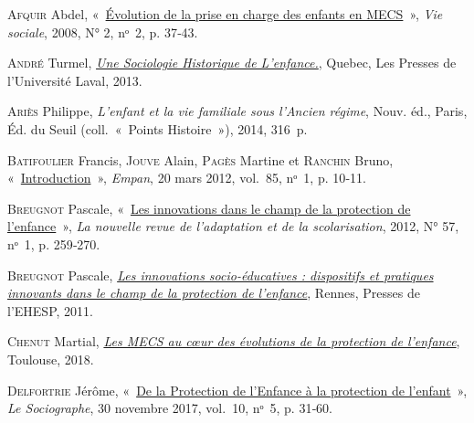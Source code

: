 \documentclass[
  12,
  a4paper,
]{report}
\newlength{\cslhangindent}
\newlength{\cslentryspacingunit} %
\newenvironment{CSLReferences}[2] %
 {%
  \setlength{\parindent}{0pt}
  \ifodd #1
  \let\oldpar\par
  \def\par{\hangindent=\cslhangindent\oldpar}
  \fi
  \setlength{\parskip}{#2\cslentryspacingunit}
 }%
 {}
\begin{document}
\hypertarget{refs}{}
\begin{CSLReferences}{0}{0}
\leavevmode{}%
\textsc{Afquir} Abdel,
{«~\href{https://www.cairn.info/revue-vie-sociale-2008-2-page-37.htm}{Évolution
de la prise en charge des enfants en MECS}~»}, \emph{Vie sociale}, 2008,
N° 2, nᵒ~2, p. 37‑43.

\leavevmode{}%
\textsc{André} Turmel,
\emph{\href{https://public.ebookcentral.proquest.com/choice/publicfullrecord.aspx?p=5514502}{Une
Sociologie Historique de L'enfance.}}, {Quebec}, {Les Presses de
l'Université Laval}, 2013.

\leavevmode{}%
\textsc{Ariès} Philippe, \emph{L'enfant et la vie familiale sous
l'Ancien régime}, Nouv. éd., {Paris}, {Éd. du Seuil} (coll.~{«~Points
Histoire~»}), 2014, 316~p.

\leavevmode{}%
\textsc{Batifoulier} Francis, \textsc{Jouve} Alain, \textsc{Pagès}
Martine et \textsc{Ranchin} Bruno,
{«~\href{http://www.cairn.info/revue-empan-2012-1-page-10.htm}{Introduction}~»},
\emph{Empan}, 20 mars 2012, vol.~85, nᵒ~1, p. 10‑11.

\leavevmode{}%
\textsc{Breugnot} Pascale,
{«~\href{https://www.cairn.info/revue-la-nouvelle-revue-de-l-adaptation-et-de-la-scolarisation-2012-1-page-259.htm}{Les
innovations dans le champ de la protection de l'enfance}~»}, \emph{La
nouvelle revue de l'adaptation et de la scolarisation}, 2012, N° 57,
nᵒ~1, p. 259‑270.

\leavevmode{}%
\textsc{Breugnot} Pascale,
\emph{\href{https://doi.org/10.3917/ehesp.breug.2011.01}{Les innovations
socio-éducatives : dispositifs et pratiques innovants dans le champ de
la protection de l'enfance}}, {Rennes}, {Presses de l'EHESP}, 2011.

\leavevmode{}%
\textsc{Chenut} Martial,
\emph{\href{http://www.cairn.info/les-mecs-au-coeur-des-evolutions-de-la-protection--9782749257686.htm}{Les
MECS au cœur des évolutions de la protection de l'enfance}}, {Toulouse},
2018.

\leavevmode{}%
\textsc{Delfortrie} Jérôme,
{«~\href{http://www.cairn.info/revue-le-sociographe-2017-5-page-31.htm}{De
la Protection de l'Enfance à la protection de l'enfant}~»}, \emph{Le
Sociographe}, 30 novembre 2017, vol.~10, nᵒ~5, p. 31‑60.


\end{CSLReferences}
\end{document}
